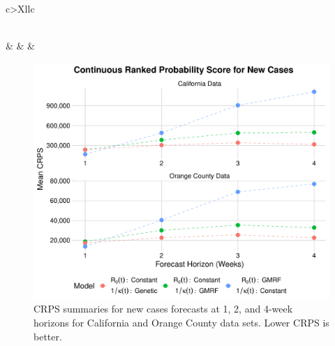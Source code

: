 \begin{xltabular}{\columnwidth}{c>{\RaggedRight}Xllc}
    \label{ch_5:tbl:real_data_prior_table}\\
\caption{TKTK}\\[\belowcaptionskip]
	 &  &  &  \\ \hline
\end{xltabular}

\begin{figure}
    \centering
    \includegraphics[width=1.0\columnwidth]{real_data_crps_comparison_dotplot_data_new_cases_plot}
    \caption[CRPS summaries for new cases forecasts for real data sets.]{CRPS summaries for new cases forecasts at 1, 2, and 4-week horizons for California and Orange County data sets. Lower CRPS is better.}
    \label{ch_5:fig:real_data_crps_comparison_dotplot_data_new_cases_plot}
\end{figure}

